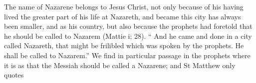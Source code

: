 The name of Nazarene belongs to Jesus Christ, not only because of his having lived the greater part of his life at Nazareth, and became this city has always been smaller, and as his country, but also because the prophets had foretold that he should be called to Nazarem (Mattie i; 28). “ And he came and done in a city called Nazareth, that might be frilibled which was spoken by the prophets. He shall be called to Nazarem.” We find in particular passage in the prophets where it is as that the Messiah should be called a Nazarene; and St Matthew only quotes\par\medskip
